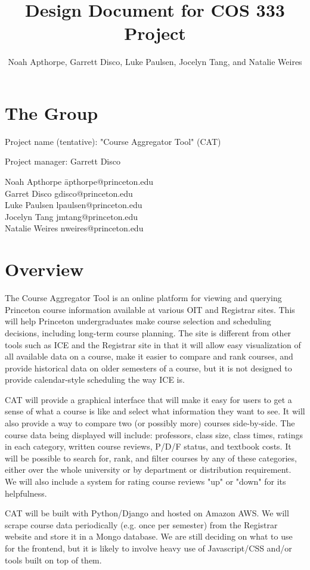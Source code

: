 \documentclass[11pt]{article}
\title{ Design Document for COS 333 Project }
\author{Noah Apthorpe, Garrett Disco, Luke Paulsen, Jocelyn Tang, and Natalie Weires}
\begin{document}
\maketitle

\section{The Group}
\par Project name (tentative): "Course Aggregator Tool" (CAT)
\par Project manager: Garrett Disco
\begin{tabbing}
Noah Apthorpe   \= apthorpe@princeton.edu \\
Garret Disco \> gdisco@princeton.edu \\
Luke Paulsen \> lpaulsen@princeton.edu \\
Jocelyn Tang \> jmtang@princeton.edu \\
Natalie Weires \> nweires@princeton.edu \\
\end{tabbing}

\section{Overview}
\par The Course Aggregator Tool is an online platform for viewing and querying Princeton course information available at various OIT and Registrar sites. This will help Princeton undergraduates make course selection and scheduling decisions, including long-term course planning. The site is different from other tools such as ICE and the Registrar site in that it will allow easy visualization of all available data on a course, make it easier to compare and rank courses, and provide historical data on older semesters of a course, but it is not designed to provide calendar-style scheduling the way ICE is.
\par CAT will provide a graphical interface that will make it easy for users to get a sense of what a course is like and select what information they want to see. It will also provide a way to compare two (or possibly more) courses side-by-side. The course data being displayed will include: professors, class size, class times, ratings in each category, written course reviews, P/D/F status, and textbook costs. It will be possible to search for, rank, and filter courses by any of these categories, either over the whole university or by department or distribution requirement. We will also include a system for rating course reviews "up" or "down" for its helpfulness.
\par CAT will be built with Python/Django and hosted on Amazon AWS. We will scrape course data periodically (e.g. once per semester) from the Registrar website and store it in a Mongo database. We are still deciding on what to use for the frontend, but it is likely to involve heavy use of Javascript/CSS and/or tools built on top of them.
\end{document}
